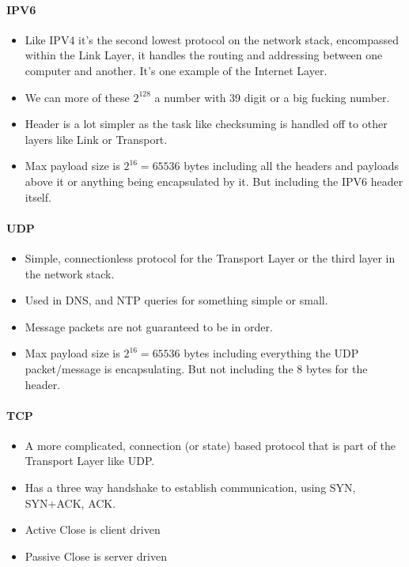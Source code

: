 \documentclass[../CMPUT-404-Notes.tex]{subfiles}
\begin{document}
  \paragraph{IPV6}
  \begin{itemize}
    \item Like IPV4 it's the second lowest protocol on the network stack, encompassed within the Link Layer, it handles the routing and addressing between one computer and another. It's one example of the Internet Layer.
    \item We can more of these \(2^{128}\) a number with 39 digit or a big fucking number. 
    \item Header is a lot simpler as the task like checksuming is handled off to other layers like Link or Transport.
    \item Max payload size is \(2^{16} = 65536\) bytes including all the headers and payloads above it or anything being encapsulated by it. But including the IPV6 header itself.
  \end{itemize}
  
  \paragraph{UDP}
  \begin{itemize}
    \item Simple, connectionless protocol for the Transport Layer or the third layer in the network stack. 
    \item Used in DNS, and NTP queries for something simple or small. 
    \item Message packets are not guaranteed to be in order. 
    \item Max payload size is \(2^{16} = 65536\) bytes including everything the UDP packet/message is encapsulating. But not including the 8 bytes for the header.  
  \end{itemize}

  \paragraph{TCP}
  \begin{itemize}
    \item A more complicated, connection (or state) based protocol that is part of the Transport Layer like UDP. 
    \item Has a three way handshake to establish communication, using SYN, SYN+ACK, ACK.
    \item Active Close is client driven
    \item Passive Close is server driven
  \end{itemize}
\end{document}
